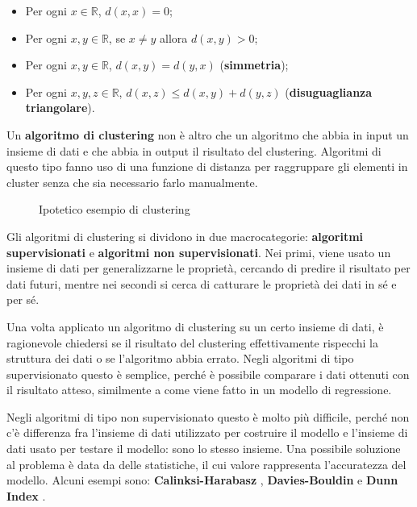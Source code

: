 \documentclass[a4paper, 12pt]{report}
\begin{document}
		\begin{itemize}
			\item
			Per ogni $x \in \mathbb{R}$, $d(x, x) = 0$;
			\item
			Per ogni $x, y \in \mathbb{R}$, se $x \neq y$ allora $d(x, y) > 0$;
			\item
			Per ogni $x, y \in \mathbb{R}$, $d(x, y) = d(y, x)$
			(\textbf{simmetria});
			\item
			Per ogni $x, y, z \in \mathbb{R}$, $d(x, z) \leq d(x, y) + d(y, z)$
			(\textbf{disuguaglianza triangolare}).
		\end{itemize}

		Un \textbf{algoritmo di clustering} non è altro che un algoritmo
		che abbia in input un insieme di dati e che abbia in output il
		risultato del clustering. Algoritmi di questo tipo fanno uso di
		una funzione di distanza per raggruppare gli elementi in cluster
		senza che sia necessario farlo manualmente.

		\begin{figure}[H]
			\centering
			
			\caption{Ipotetico esempio di clustering}
		\end{figure}

		Gli algoritmi di clustering si dividono in due macrocategorie:
		\textbf{algoritmi supervisionati} e \textbf{algoritmi non
		supervisionati}. Nei primi, viene usato un insieme di dati per
		generalizzarne le proprietà, cercando di predire il risultato
		per dati futuri, mentre nei secondi si cerca di catturare le
		proprietà dei dati in sé e per sé.

		Una volta applicato un algoritmo di clustering su un certo insieme
		di dati, è ragionevole chiedersi se il risultato del clustering
		effettivamente rispecchi la struttura dei dati o se l'algoritmo
		abbia errato. Negli algoritmi di tipo supervisionato questo è
		semplice, perché è possibile comparare i dati ottenuti con il
		risultato atteso, similmente a come viene fatto in un modello di
		regressione.

		Negli algoritmi di tipo non supervisionato questo è molto
		più difficile, perché non c'è differenza fra l'insieme di
		dati utilizzato per costruire il modello e l'insieme di
		dati usato per testare il modello: sono lo stesso insieme.
		Una possibile soluzione al problema è data da delle statistiche,
		il cui valore rappresenta l'accuratezza del modello. Alcuni
		esempi sono: \textbf{Calinksi-Harabasz} \cite{Calinski01011974},
		\textbf{Davies-Bouldin} \cite{4766909} e \textbf{Dunn Index}
		\cite{Dunn01011974}.
\end{document}
